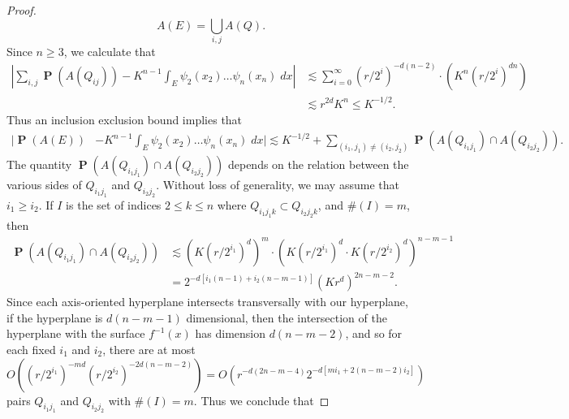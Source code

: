 \documentclass[12pt,reqno]{article}
\numberwithin{equation}{section}
\numberwithin{theorem}{section}
\DeclareMathOperator{\PP}{\mathbf{P}}
\begin{document}
\begin{proof}
    \[ A(E) = \bigcup_{i,j} A(Q). \]
    Since $n \geq 3$, we calculate that
    \begin{align*}
        \left| \sum_{i,j} \PP(A(Q_{ij})) - K^{n-1} \int_E \psi_2(x_2) \dots \psi_n(x_n)\; dx \right| &\lesssim \sum_{i = 0}^\infty (r/2^i)^{-d(n-2)} \cdot \left( K^n (r/2^i)^{dn} \right)\\
        &\lesssim r^{2d} K^n \leq K^{-1/2}.
    \end{align*}
    Thus an inclusion exclusion bound implies that
    \begin{align*}
        \Big| \PP(A(E)) &- K^{n-1} \int_E \psi_2(x_2) \dots \psi_n(x_n)\; dx \Big| \lesssim K^{-1/2} + \sum_{(i_1,j_1) \neq (i_2,j_2)} \PP(A(Q_{i_1j_1}) \cap A(Q_{i_2j_2})).
    \end{align*}
    The quantity $\PP(A(Q_{i_1j_1}) \cap A(Q_{i_2j_2}))$ depends on the relation between the various sides of $Q_{i_1j_1}$ and $Q_{i_2j_2}$. Without loss of generality, we may assume that $i_1 \geq i_2$. If $I$ is the set of indices $2 \leq k \leq n$ where $Q_{i_1j_1k} \subset Q_{i_2j_2k}$, and $\#(I) = m$, then
    \begin{align*}
        \PP(A(Q_{i_1j_1}) \cap A(Q_{i_2j_2})) &\lesssim (K(r/2^{i_1})^d)^m \cdot (K(r/2^{i_1})^d \cdot K(r/2^{i_2})^d)^{n-m-1}\\
        &= 2^{-d[i_1(n-1) + i_2(n-m-1)]} (Kr^d)^{2n - m-2}.
    \end{align*}
    Since each axis-oriented hyperplane intersects transversally with our hyperplane, if the hyperplane is $d(n-m-1)$ dimensional, then the intersection of the hyperplane with the surface $f^{-1}(x)$ has dimension $d(n-m-2)$, and so for each fixed $i_1$ and $i_2$, there are at most
    \[ O((r/2^{i_1})^{-md} (r/2^{i_2})^{-2d(n-m-2)}) = O(r^{-d(2n - m - 4)} 2^{-d[mi_1 + 2(n-m-2)i_2]} ) \]
    pairs $Q_{i_1j_1}$ and $Q_{i_2j_2}$ with $\#(I) = m$. Thus we conclude that

\end{proof}
\end{document}
